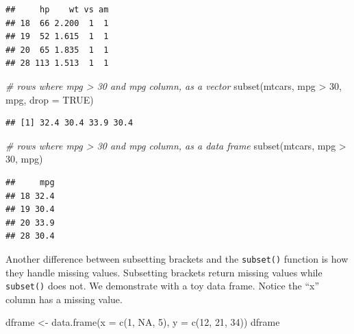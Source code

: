 \documentclass[
]{book}
\newenvironment{Shaded}{\begin{snugshade}}{\end{snugshade}}
\newcommand{\AttributeTok}[1]{\textcolor[rgb]{0.77,0.63,0.00}{#1}}
\newcommand{\CommentTok}[1]{\textcolor[rgb]{0.56,0.35,0.01}{\textit{#1}}}
\newcommand{\ConstantTok}[1]{\textcolor[rgb]{0.00,0.00,0.00}{#1}}
\newcommand{\DecValTok}[1]{\textcolor[rgb]{0.00,0.00,0.81}{#1}}
\newcommand{\FunctionTok}[1]{\textcolor[rgb]{0.00,0.00,0.00}{#1}}
\newcommand{\NormalTok}[1]{#1}
\newcommand{\OtherTok}[1]{\textcolor[rgb]{0.56,0.35,0.01}{#1}}
\newcommand{\SpecialCharTok}[1]{\textcolor[rgb]{0.00,0.00,0.00}{#1}}
\begin{document}
\begin{verbatim}
##     hp    wt vs am
## 18  66 2.200  1  1
## 19  52 1.615  1  1
## 20  65 1.835  1  1
## 28 113 1.513  1  1
\end{verbatim}

\begin{Shaded}
\begin{Highlighting}[]
\CommentTok{\# rows where mpg \textgreater{} 30 and mpg column, as a vector}
\FunctionTok{subset}\NormalTok{(mtcars, mpg }\SpecialCharTok{\textgreater{}} \DecValTok{30}\NormalTok{, mpg, }\AttributeTok{drop =} \ConstantTok{TRUE}\NormalTok{)}
\end{Highlighting}
\end{Shaded}

\begin{verbatim}
## [1] 32.4 30.4 33.9 30.4
\end{verbatim}

\begin{Shaded}
\begin{Highlighting}[]
\CommentTok{\# rows where mpg \textgreater{} 30 and mpg column, as a data frame}
\FunctionTok{subset}\NormalTok{(mtcars, mpg }\SpecialCharTok{\textgreater{}} \DecValTok{30}\NormalTok{, mpg)}
\end{Highlighting}
\end{Shaded}

\begin{verbatim}
##     mpg
## 18 32.4
## 19 30.4
## 20 33.9
## 28 30.4
\end{verbatim}

Another difference between subsetting brackets and the \texttt{subset()} function is how they handle missing values. Subsetting brackets return missing values while \texttt{subset()} does not. We demonstrate with a toy data frame. Notice the ``x'' column has a missing value.

\begin{Shaded}
\begin{Highlighting}[]
\NormalTok{dframe }\OtherTok{\textless{}{-}} \FunctionTok{data.frame}\NormalTok{(}\AttributeTok{x =} \FunctionTok{c}\NormalTok{(}\DecValTok{1}\NormalTok{, }\ConstantTok{NA}\NormalTok{, }\DecValTok{5}\NormalTok{), }
                     \AttributeTok{y =} \FunctionTok{c}\NormalTok{(}\DecValTok{12}\NormalTok{, }\DecValTok{21}\NormalTok{, }\DecValTok{34}\NormalTok{))}
\NormalTok{dframe}
\end{Highlighting}
\end{Shaded}
\end{document}
